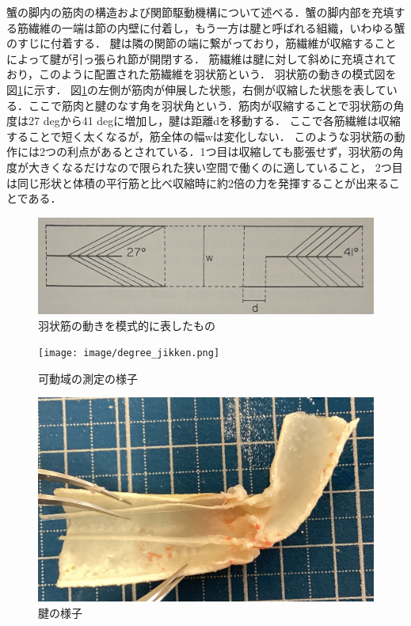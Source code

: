 蟹の脚内の筋肉の構造および関節駆動機構について述べる．蟹の脚内部を充填する筋繊維の一端は節の内壁に付着し，もう一方は腱と呼ばれる組織，いわゆる蟹のすじに付着する．
腱は隣の関節の端に繋がっており，筋繊維が収縮することによって腱が引っ張られ節が開閉する．
筋繊維は腱に対して斜めに充填されており，このように配置された筋繊維を羽状筋という．
羽状筋の動きの模式図を図\ref{fig:ujo}に示す．
図\ref{fig:ujo}の左側が筋肉が伸展した状態，右側が収縮した状態を表している．ここで筋肉と腱のなす角を羽状角という．筋肉が収縮することで羽状筋の角度は27 degから41 degに増加し，腱は距離dを移動する．
ここで各筋繊維は収縮することで短く太くなるが，筋全体の幅wは変化しない．
このような羽状筋の動作には2つの利点があるとされている．1つ目は収縮しても膨張せず，羽状筋の角度が大きくなるだけなので限られた狭い空間で働くのに適していること，
2つ目は同じ形状と体積の平行筋と比べ収縮時に約2倍の力を発揮することが出来ることである\cite{warner1977biology}．
\begin{figure}[t]
  \centering
  \includegraphics[scale=0.18]{image/ujo.JPG}
  \vspace{5mm}
  \caption{羽状筋の動きを模式的に表したもの\cite{warner1977biology}}
  \label{fig:ujo}
\end{figure}
\begin{figure}[t]
  \begin{minipage}[b]{0.49\hsize}
    \centering
    \texttt{[image: image/degree\_jikken.png]}
    \caption{可動域の測定の様子}
    \label{fig:sokutei}
  \end{minipage}
  \begin{minipage}[b]{0.49\hsize}
    \centering
    \includegraphics[scale=0.1]{image/setukanmaku.jpg}
    \caption{腱の様子\cite{hasegawa}}
    \label{fig:ken}
  \end{minipage}
\end{figure}
